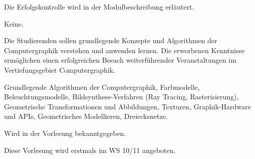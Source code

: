 \begin{course}

\setdoclanguagegerman
{}



\coursehead


\label{cour_8671.dp_997}


\begin{styleenv}
\begin{assessment}
Die Erfolgskontrolle wird in der Modulbeschreibung erläutert.


\end{assessment}

\begin{conditions}Keine.\end{conditions}


\end{styleenv}

\begin{learningoutcomes}
Die Studierenden sollen grundlegende Konzepte und Algorithmen der Computergraphik verstehen und anwenden lernen. Die erworbenen Kenntnisse ermöglichen einen erfolgreichen Besuch weiterführender Veranstaltungen im Vertiefungsgebiet Computergraphik.


\end{learningoutcomes}

\begin{content}
Grundlegende Algorithmen der Computergraphik, Farbmodelle, Beleuchtungsmodelle, Bildsynthese-Verfahren (Ray Tracing, Rasterisierung), Geometrische Transformationen und Abbildungen, Texturen, Graphik-Hardware und APIs, Geometrisches Modellieren, Dreiecksnetze.


\end{content}



\begin{literature}Wird in der Vorlesung bekanntgegeben.

\end{literature}

\begin{remarks}Diese Vorlesung wird erstmals im WS 10/11 angeboten.

\end{remarks}

\end{course}